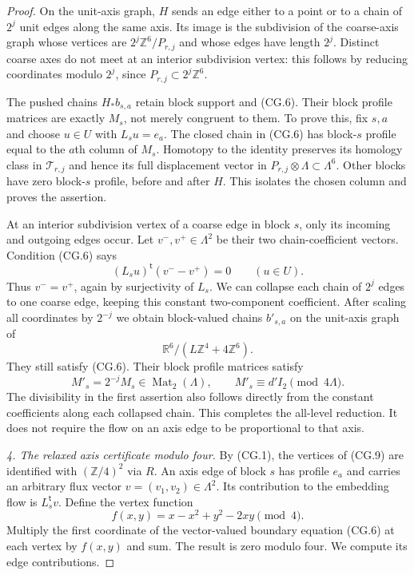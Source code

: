 \begin{proof}
On the unit-axis graph, $H$ sends an edge either to a point or
to a chain of $2^j$ unit edges along the same axis. Its image is
the subdivision of the coarse-axis graph whose vertices are
$2^j\mathbb Z^6/P_{r,j}$ and whose edges have length $2^j$.
Distinct coarse axes do not meet at an interior subdivision
vertex: this follows by reducing coordinates modulo $2^j$, since
$P_{r,j}\subset2^j\mathbb Z^6$.

The pushed chains $H_*b_{s,a}$ retain block support and (CG.6).
Their block profile matrices are exactly $M_s$, not merely
congruent to them. To prove this, fix $s,a$ and choose $u\in U$
with $L_su=e_a$. The closed chain in (CG.6) has block-$s$
profile equal to the $a$th column of $M_s$. Homotopy to the
identity preserves its homology class in $\mathcal T_{r,j}$ and
hence its full displacement vector in
$P_{r,j}\otimes\Lambda\subset\Lambda^6$. Other blocks have
zero block-$s$ profile, before and after $H$. This isolates the
chosen column and proves the assertion.

At an interior subdivision vertex of a coarse edge in block $s$,
only its incoming and outgoing edges occur. Let $v^-,v^+\in
\Lambda^2$ be their two chain-coefficient vectors. Condition
(CG.6) says
\[
                   (L_su)^{\mathsf t}(v^--v^+)=0
                                    \qquad(u\in U).
\]
Thus $v^-=v^+$, again by surjectivity of $L_s$. We can collapse
each chain of $2^j$ edges to one coarse edge, keeping this
constant two-component coefficient. After scaling all coordinates
by $2^{-j}$ we obtain block-valued chains $b'_{s,a}$ on the
unit-axis graph of
\[
             \mathbb R^6/(L\mathbb Z^4+4\mathbb Z^6).
 \tag{CG.9}
\]
They still satisfy (CG.6). Their block profile matrices satisfy
\[
          M'_s=2^{-j}M_s\in\operatorname{Mat}_2(\Lambda),
          \qquad M'_s\equiv d'I_2\pmod{4\Lambda}.
 \tag{CG.10}
\]
The divisibility in the first assertion also follows directly
from the constant coefficients along each collapsed chain.
This completes the all-level reduction. It does not require
the flow on an axis edge to be proportional to that axis.

\emph{4. The relaxed axis certificate modulo four.}
By (CG.1), the vertices of (CG.9) are identified with
$(\mathbb Z/4)^2$ via $R$. An axis edge of block $s$ has profile
$e_a$ and carries an arbitrary flux vector $v=(v_1,v_2)\in
\Lambda^2$. Its contribution to the embedding flow is
$L_s^{\mathsf t}v$. Define the vertex function
\[
                  f(x,y)=x-x^2+y^2-2xy\pmod4.
 \tag{CG.11}
\]
Multiply the first coordinate of the vector-valued boundary
equation (CG.6) at each vertex by $f(x,y)$ and sum. The result
is zero modulo four. We compute its edge contributions.


\end{proof}

